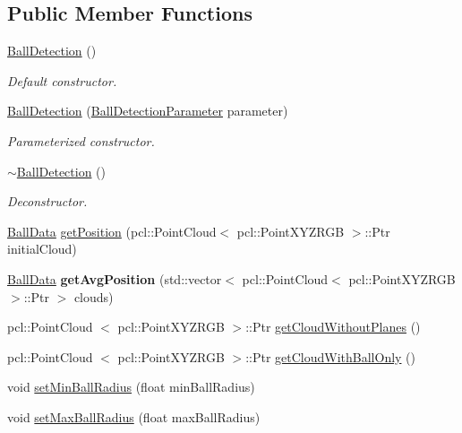 \subsection*{\-Public \-Member \-Functions}
\begin{DoxyCompactItemize}
\item 
\hypertarget{classBallDetection_ad9d5c2d58f523f50f4c5043442613c57}{\hyperlink{classBallDetection_ad9d5c2d58f523f50f4c5043442613c57}{\-Ball\-Detection} ()}\label{classBallDetection_ad9d5c2d58f523f50f4c5043442613c57}

\begin{DoxyCompactList}\small\item\em \-Default constructor. \end{DoxyCompactList}\item 
\hypertarget{classBallDetection_a831e88ded921b14f7daa271491632ab1}{\hyperlink{classBallDetection_a831e88ded921b14f7daa271491632ab1}{\-Ball\-Detection} (\hyperlink{classBallDetectionParameter}{\-Ball\-Detection\-Parameter} parameter)}\label{classBallDetection_a831e88ded921b14f7daa271491632ab1}

\begin{DoxyCompactList}\small\item\em \-Parameterized constructor. \end{DoxyCompactList}\item 
\hypertarget{classBallDetection_ae36ea610b773934ef6bb44d65e5deda5}{\hyperlink{classBallDetection_ae36ea610b773934ef6bb44d65e5deda5}{$\sim$\-Ball\-Detection} ()}\label{classBallDetection_ae36ea610b773934ef6bb44d65e5deda5}

\begin{DoxyCompactList}\small\item\em \-Deconstructor. \end{DoxyCompactList}\item 
\hyperlink{structBallDetection_1_1BallData}{\-Ball\-Data} \hyperlink{classBallDetection_a8d23e7c2e31b2c65ae6701027bfb33b4}{get\-Position} (pcl\-::\-Point\-Cloud$<$ pcl\-::\-Point\-X\-Y\-Z\-R\-G\-B $>$\-::\-Ptr initial\-Cloud)
\item 
\hypertarget{classBallDetection_aa010084f79c69aeeddca287f504ec0ca}{\hyperlink{structBallDetection_1_1BallData}{\-Ball\-Data} {\bfseries get\-Avg\-Position} (std\-::vector$<$ pcl\-::\-Point\-Cloud$<$ pcl\-::\-Point\-X\-Y\-Z\-R\-G\-B $>$\-::\-Ptr $>$ clouds)}\label{classBallDetection_aa010084f79c69aeeddca287f504ec0ca}

\item 
pcl\-::\-Point\-Cloud\*
$<$ pcl\-::\-Point\-X\-Y\-Z\-R\-G\-B $>$\-::\-Ptr \hyperlink{classBallDetection_acc5a355418a87b4f27f62aaea856d77b}{get\-Cloud\-Without\-Planes} ()
\item 
pcl\-::\-Point\-Cloud\*
$<$ pcl\-::\-Point\-X\-Y\-Z\-R\-G\-B $>$\-::\-Ptr \hyperlink{classBallDetection_a00d7c20455d17e2dc18a20afcea65590}{get\-Cloud\-With\-Ball\-Only} ()
\item 
void \hyperlink{classBallDetection_afa3245d2178612a13fb2398f9fa6cfe5}{set\-Min\-Ball\-Radius} (float min\-Ball\-Radius)
\item 
void \hyperlink{classBallDetection_aeee9c66437f09a6535152433600ef0f3}{set\-Max\-Ball\-Radius} (float max\-Ball\-Radius)
\end{DoxyCompactItemize}
